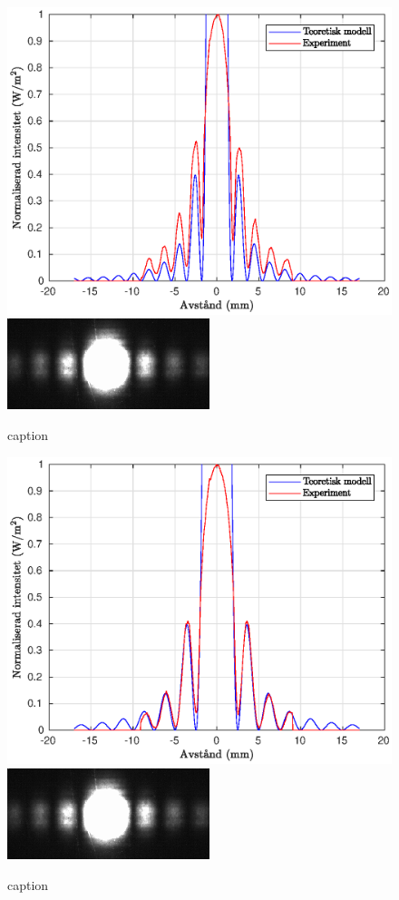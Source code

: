 \documentclass[a4paper]{article}
\begin{document}
\begin{figure}[h!]
	\centering
	\includegraphics[width=0.75\linewidth]{Data/Figurer/variabelEnkelspalt1.eps}
	\includegraphics[width=0.5\linewidth]{Data/Figurer/variabelEnkelspalt2.png}
	\caption{caption}
	\label{fig:variabelEnkelspalt2}
\end{figure}

\begin{figure}[h!]
	\centering
	\includegraphics[width=0.75\linewidth]{Data/Figurer/variabelEnkelspalt2.eps}
	\includegraphics[width=0.5\linewidth]{Data/Figurer/variabelEnkelspalt2.png}
	\caption{caption}
	\label{fig:variabelEnkelspalt3}
\end{figure}
\end{document}
